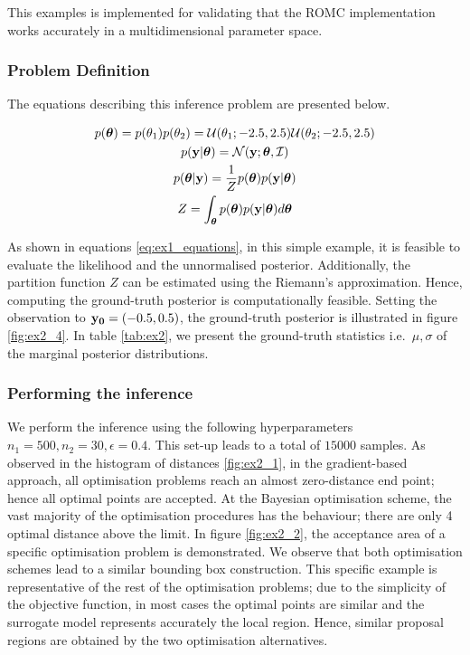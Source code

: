 This examples is implemented for validating that the ROMC
implementation works accurately in a multidimensional parameter
space.

\subsubsection*{Problem Definition}

The equations describing this inference problem are presented below.

\begin{gather} \label{eq:ex1_equations}
  p(\boldsymbol{\theta}) = p(\theta_1)p(\theta_2)
  = \mathcal{U}(\theta_1; -2.5, 2.5) \mathcal{U}(\theta_2; -2.5, 2.5)\\
  p(\mathbf{y}|\boldsymbol{\theta}) = \mathcal{N}(\mathbf{y};\boldsymbol{\theta}, \mathcal{I})\\
  p(\boldsymbol{\theta}|\mathbf{y}) = \frac{1}{Z}p(\boldsymbol{\theta})p(\mathbf{y}|\boldsymbol{\theta})\\
  Z = \int_{\boldsymbol{\theta}} p(\boldsymbol{\theta})p(\mathbf{y}|\boldsymbol{\theta}) d\boldsymbol{\theta}
\end{gather}

\noindent
As shown in equations \eqref{eq:ex1_equations}, in this simple
example, it is feasible to evaluate the likelihood and the
unnormalised posterior. Additionally, the partition function $Z$ can
be estimated using the Riemann's approximation. Hence, computing the
ground-truth posterior is computationally feasible. Setting the
observation to $\mathbf{y_0}=(-0.5,0.5)$, the ground-truth posterior is
illustrated in figure \ref{fig:ex2_4}. In table \ref{tab:ex2}, we
present the ground-truth statistics i.e.\ $\mu, \sigma$ of the
marginal posterior distributions.

\subsubsection*{Performing the inference}

We perform the inference using the following hyperparameters
$n_1=500, n_2=30, \epsilon=0.4$. This set-up leads to a total of
$15000$ samples. As observed in the histogram of distances
\ref{fig:ex2_1}, in the gradient-based approach, all optimisation
problems reach an almost zero-distance end point; hence all optimal
points are accepted. At the Bayesian optimisation scheme, the vast
majority of the optimisation procedures has the behaviour; there are
only 4 optimal distance above the limit. In figure \ref{fig:ex2_2},
the acceptance area of a specific optimisation problem is
demonstrated. We observe that both optimisation schemes lead to a
similar bounding box construction. This specific example is
representative of the rest of the optimisation problems; due to the
simplicity of the objective function, in most cases the optimal points
are similar and the surrogate model represents accurately the local
region. Hence, similar proposal regions are obtained by the two
optimisation alternatives.

